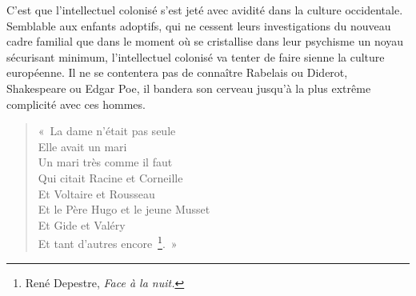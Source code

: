 \documentclass[french,twoside]{book} %
\begin{document}
\bigbreak
\noindent C’est que l’intellectuel colonisé s’est jeté avec avidité dans la culture occidentale. Semblable aux enfants adoptifs, qui ne cessent leurs investigations du nouveau cadre familial que dans le moment où se cristallise dans leur psychisme un noyau sécurisant minimum, l’intellectuel colonisé va tenter de faire sienne la culture européenne. Il ne se contentera pas de connaître Rabelais ou Diderot, Shakespeare ou Edgar Poe, il bandera son cerveau jusqu’à la plus extrême complicité avec ces hommes.\par


\begin{verse}
« La dame n’était pas seule\\
Elle avait un mari\\
Un mari très comme il faut\\
Qui citait Racine et Corneille\\
Et Voltaire et Rousseau\\
Et le Père Hugo et le jeune Musset\\
Et Gide et Valéry\\
Et tant d’autres encore \footnote{René Depestre, \emph{Face à la nuit.}}. »\\
\end{verse}
\end{document}
